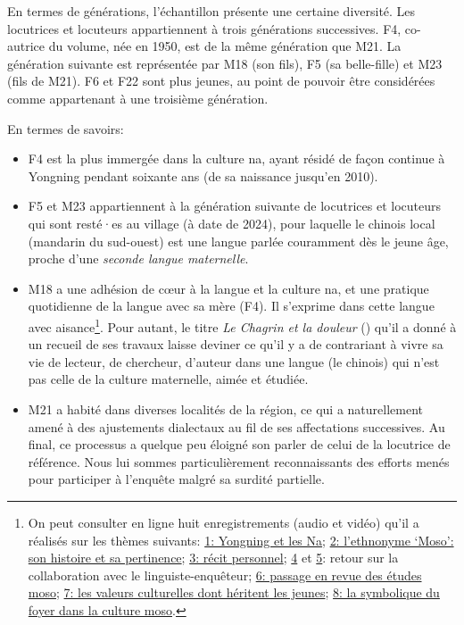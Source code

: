 En termes de générations, l'échantillon présente une certaine diversité. Les locutrices et locuteurs appartiennent à trois générations successives. F4, co-autrice du volume, née en 1950, est de la même génération que M21. La génération suivante est représentée par M18 (son fils), F5 (sa belle-fille) et M23 (fils de M21). F6 et F22 sont plus jeunes, au point de pouvoir être considérées comme appartenant à une troisième génération.

En termes de savoirs:

\begin{itemize}
    \item F4 est la plus immergée dans la culture na, ayant résidé de façon continue à Yongning pendant soixante ans (de sa naissance jusqu'en 2010).
    \item F5 et M23 appartiennent à la génération suivante de locutrices et locuteurs qui sont resté·es au village (à date de 2024), pour laquelle le chinois local (mandarin du sud-ouest) est une langue parlée couramment dès le jeune âge, proche d'une \emph{seconde langue maternelle}.
    \item M18 a une adhésion de cœur à la langue et la culture na, et une pratique quotidienne de la langue avec sa mère (F4). Il s'exprime dans cette langue avec aisance\footnote{On peut consulter en ligne huit enregistrements (audio et vidéo) qu'il a réalisés sur les thèmes suivants:
    \href{https://doi.org/10.24397/pangloss-0007734}{1: Yongning et les Na}; \href{https://doi.org/10.24397/pangloss-0007740}{2: l'ethnonyme ‘Moso’: son histoire et sa pertinence}; \href{https://doi.org/10.24397/pangloss-0007730}{3: récit personnel}; \href{https://doi.org/10.24397/pangloss-0007736}{4} et \href{https://doi.org/10.24397/pangloss-0007738}{5}: retour sur la collaboration avec le linguiste-enquêteur; \href{https://doi.org/10.24397/pangloss-0007742}{6: passage en revue des études moso}; \href{https://doi.org/10.24397/pangloss-0007728}{7: les valeurs culturelles dont héritent les jeunes}; \href{https://doi.org/10.24397/pangloss-0007732}{8: la symbolique du foyer dans la culture moso}.}.
    Pour autant, le titre \emph{Le Chagrin et la douleur} () qu'il a donné à un recueil de ses travaux \parencite{latami2016} laisse deviner ce qu'il y a de contrariant à vivre sa vie de lecteur, de chercheur, d'auteur dans une langue (le chinois) qui n'est pas celle de la culture maternelle, aimée et étudiée.
    \item M21 a habité dans diverses localités de la région, ce qui a naturellement amené à des ajustements dialectaux au fil de ses affectations successives. Au final, ce processus a quelque peu éloigné son parler de celui de la locutrice de référence. Nous lui sommes particulièrement reconnaissants des efforts menés pour participer à l'enquête malgré sa surdité partielle.
\end{itemize}
